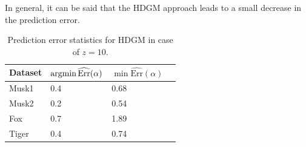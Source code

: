 In general, it can be said that the HDGM approach leads to a small decrease in the prediction error. 
\begin{table}[h]
	\centering
	\begin{tabular}{|l|l|l|l|}
		\hline
		Dataset  &  $\mathop{\mathrm{argmin}} \widehat{\mathrm{Err}}(\alpha)$& $\min \widehat{\mathrm{Err}}(\alpha)$ \\ \hline
		Musk1              & 0.4      & 0.68   \\ \hline
		Musk2             & 0.2      & 0.54   \\ \hline
		Fox                 & 0.7      & 1.89  \\ \hline
		Tiger            & 0.4      & 0.74      \\ \hline
	\end{tabular}
	\caption{Prediction error statistics for HDGM in case of $z=10$.}
	\label{tab:resultsHDGE}
\end{table}
